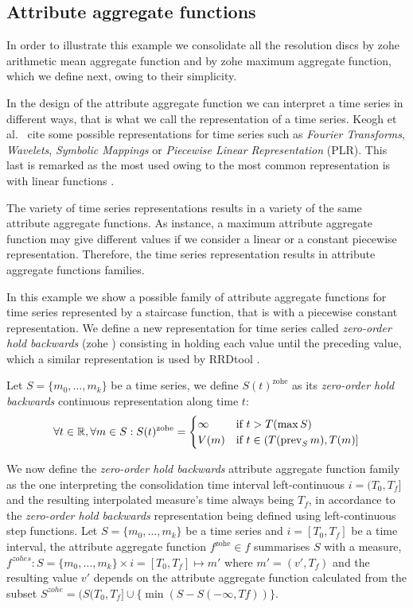 \subsection{Attribute aggregate functions}

In order to illustrate this example we consolidate all the resolution
discs by zohe arithmetic mean aggregate function and by zohe maximum
aggregate function, which we define next, owing to their simplicity.

In the design of the attribute aggregate function we can interpret
a time series in different ways, that is what we call the
representation of a time series. Keogh et al.\ \cite{last:keogh} cite
some possible representations for time series such as \emph{Fourier
  Transforms}, \emph{Wavelets}, \emph{Symbolic Mappings} or
\emph{Piecewise Linear Representation} (PLR). This last is remarked as
the most used owing to the most common representation is with linear
functions \cite{keogh01}.

The variety of time series representations results in a variety of the
same attribute aggregate functions. As instance, a maximum attribute
aggregate function may give different values if we consider a linear
or a constant piecewise representation. Therefore, the time series
representation results in attribute aggregate functions families.

In this example we show a possible family of attribute aggregate
functions for time series represented by a staircase function, that is
with a piecewise constant representation.  We define a new
representation for time series called \emph{zero-order hold backwards}
(zohe%
) consisting in holding each value until the preceding value, which a
similar representation is used by RRDtool \cite{lisa98:oetiker}.

Let $S=\{m_0,\ldots,m_k\}$ be a time series, we define
$S(t)^{\text{zohe}}$ as its \emph{zero-order hold backwards}
continuous representation along time $t$:
\[
\forall t \in \mathbb{R}  ,\forall m \in S:
S(t)^{\text{zohe}} =  
\begin{cases}
  \infty & \text{if } t > T(\max S) \\%
  V(m) & \text{if }  t\in (T(\prev_S m),T(m)]
\end{cases}
\]


We now define the \emph{zero-order hold backwards} attribute
aggregate function family as the one interpreting the
consolidation time interval left-continuous $i=(T_0,T_f]$ and the
resulting interpolated measure's time always being $T_f$, in
accordance to the \emph{zero-order hold backwards} representation
being defined using left-continuous step functions.  Let
$S=\{m_0,\ldots,m_k\}$ be a time series and $i=[T_0,T_f]$ be a time
interval, the attribute aggregate function $f^{\text{zohe}}\in f$
summarises $S$ with a measure, $f^{zohes}: S=\{m_0,\ldots,m_k\} \times
i=[T_0,T_f] \mapsto m'$ where $m'=(v',T_f)$ and the resulting value
$v'$ depends on the attribute aggregate function calculated from
the subset $S^{zohe}=(S(T_0,T_f] \cup \{\min(S-S(-\infty,Tf))\}$.

